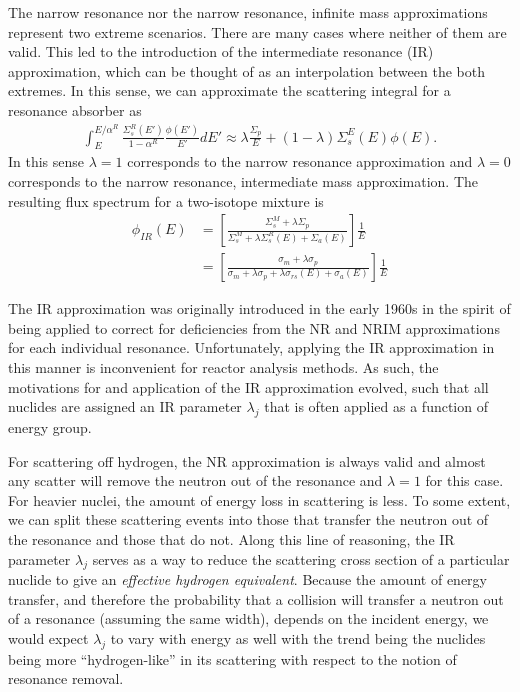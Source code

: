 The narrow resonance nor the narrow resonance, infinite mass approximations represent two extreme scenarios. There are many cases where neither of them are valid. This led to the introduction of the intermediate resonance (IR) approximation, which can be thought of as an interpolation between the both extremes. In this sense, we can approximate the scattering integral for a resonance absorber as
\begin{align}
  \int_E^{E/\alpha^R} \frac{\Sigma_s^R(E')}{ 1 - \alpha^R } \frac{ \phi(E') }{ E' } dE' \approx \lambda \frac{\Sigma_p}{E} + ( 1 - \lambda ) \Sigma_s^E(E) \phi(E).
\end{align}
In this sense $\lambda = 1$ corresponds to the narrow resonance approximation and $\lambda = 0$ corresponds to the narrow resonance, intermediate mass approximation. The resulting flux spectrum for a two-isotope mixture is
\begin{align}
  \phi_{IR}(E) 
  &= \left[ \frac{ \Sigma_s^M + \lambda \Sigma_p }{ \Sigma_s^M + \lambda \Sigma_s^R(E) + \Sigma_a(E) } \right] \frac{1}{E} \nonumber \\
  &= \left[ \frac{ \sigma_m + \lambda \sigma_p }{ \sigma_m + \lambda \sigma_p + \lambda \sigma_{rs}(E) + \sigma_a(E) } \right] \frac{1}{E}  \label{Eq:libraryGeneration_IRFluxSpectrum_TwoSpecies}
\end{align}

The IR approximation was originally introduced in the early 1960s in the spirit of being applied to correct for deficiencies from the NR and NRIM approximations for each individual resonance. Unfortunately, applying the IR approximation in this manner is inconvenient for reactor analysis methods. As such, the motivations for and application of the IR approximation evolved, such that all nuclides are assigned an IR parameter $\lambda_j$ that is often applied as a function of energy group.

For scattering off hydrogen, the NR approximation is always valid and almost any scatter will remove the neutron out of the resonance and $\lambda = 1$ for this case. For heavier nuclei, the amount of energy loss in scattering is less. To some extent, we can split these scattering events into those that transfer the neutron out of the resonance and those that do not. Along this line of reasoning, the IR parameter $\lambda_j$ serves as a way to reduce the scattering cross section of a particular nuclide to give an \emph{effective hydrogen equivalent}. Because the amount of energy transfer, and therefore the probability that a collision will transfer a neutron out of a resonance (assuming the same width), depends on the incident energy, we would expect $\lambda_j$ to vary with energy as well with the trend being the nuclides being more ``hydrogen-like'' in its scattering with respect to the notion of resonance removal.

